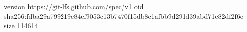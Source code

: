 version https://git-lfs.github.com/spec/v1
oid sha256:fdba29a799219e84ef9053c13b7470f15db8c1afbb9d291d39abd71c82df2f6e
size 114614
